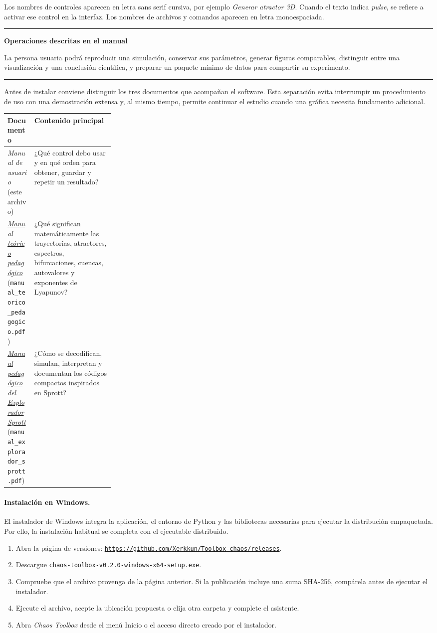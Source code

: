 \documentclass[11pt]{article}
\newcommand{\boton}[1]{\textsf{\itshape #1}}
\newcommand{\archivo}[1]{\nolinkurl{#1}}
\newcommand{\urlimpresa}[1]{\href{#1}{\nolinkurl{#1}}}
\newcommand{\manualteorico}{\href{run:manual_teorico_pedagogico.pdf}{\emph{Manual teórico pedagógico}} (\nolinkurl{manual_teorico_pedagogico.pdf})}
\newcommand{\manualsprott}{\href{run:manual_explorador_sprott.pdf}{\emph{Manual pedagógico del Explorador Sprott}} (\nolinkurl{manual_explorador_sprott.pdf})}
\newenvironment{cajaverde}[1]
{\begin{center}\begin{minipage}{0.93\linewidth}\color{GrisTexto}
\textcolor{Turquesa}{\rule{\linewidth}{0.8pt}}\par\smallskip
\textcolor{Turquesa}{\bfseries #1}\par\smallskip}
{\par\smallskip\textcolor{Turquesa}{\rule{\linewidth}{0.8pt}}\end{minipage}\end{center}}
\begin{document}
Los nombres de controles aparecen en letra sans serif cursiva, por ejemplo \boton{Generar atractor 3D}. Cuando el texto indica \emph{pulse}, se refiere a activar ese control en la interfaz. Los nombres de archivos y comandos aparecen en letra monoespaciada.

\begin{cajaverde}{Operaciones descritas en el manual}
La persona usuaria podrá reproducir una simulación, conservar sus parámetros, generar figuras comparables, distinguir entre una visualización y una conclusión científica, y preparar un paquete mínimo de datos para compartir su experimento.
\end{cajaverde}

Antes de instalar conviene distinguir los tres documentos que acompañan el software. Esta separación evita interrumpir un procedimiento de uso con una demostración extensa y, al mismo tiempo, permite continuar el estudio cuando una gráfica necesita fundamento adicional.

\begin{tabularx}{\linewidth}{>{\raggedright\arraybackslash}p{0.25\linewidth}X}
\toprule
Documento & Contenido principal \\
\midrule
\emph{Manual de usuario} (este archivo) & ¿Qué control debo usar y en qué orden para obtener, guardar y repetir un resultado? \\
\manualteorico & ¿Qué significan matemáticamente las trayectorias, atractores, espectros, bifurcaciones, cuencas, autovalores y exponentes de Lyapunov? \\
\manualsprott & ¿Cómo se decodifican, simulan, interpretan y documentan los códigos compactos inspirados en Sprott? \\
\bottomrule
\end{tabularx}

\paragraph{Instalación en Windows.}

El instalador de Windows integra la aplicación, el entorno de Python y las bibliotecas necesarias para ejecutar la distribución empaquetada. Por ello, la instalación habitual se completa con el ejecutable distribuido.

\begin{enumerate}
  \item Abra la página de versiones: \urlimpresa{https://github.com/Xerkkun/Toolbox-chaos/releases}.
  \item Descargue \archivo{chaos-toolbox-v0.2.0-windows-x64-setup.exe}.
  \item Compruebe que el archivo provenga de la página anterior. Si la publicación incluye una suma SHA-256, compárela antes de ejecutar el instalador.
  \item Ejecute el archivo, acepte la ubicación propuesta o elija otra carpeta y complete el asistente.
  \item Abra \emph{Chaos Toolbox} desde el menú Inicio o el acceso directo creado por el instalador.
\end{enumerate}
\end{document}
